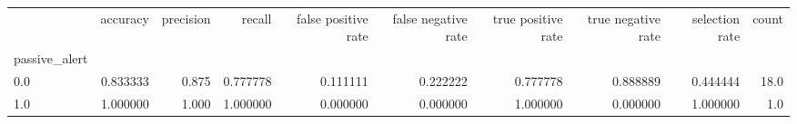 \begin{tabular}{lrrrrrrrrr}
\toprule
{} &  accuracy &  precision &    recall &  false positive rate &  false negative rate &  true positive rate &  true negative rate &  selection rate &  count \\
passive\_alert &           &            &           &                      &                      &                     &                     &                 &        \\
\midrule
0.0           &  0.833333 &      0.875 &  0.777778 &             0.111111 &             0.222222 &            0.777778 &            0.888889 &        0.444444 &   18.0 \\
1.0           &  1.000000 &      1.000 &  1.000000 &             0.000000 &             0.000000 &            1.000000 &            0.000000 &        1.000000 &    1.0 \\
\bottomrule
\end{tabular}
